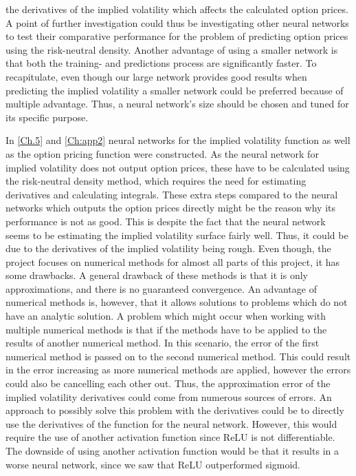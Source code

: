 the derivatives of the implied volatility which affects the calculated option prices. A point of further investigation could thus be investigating other neural networks to test their comparative performance for the problem of predicting option prices using the risk-neutral density. Another advantage of using a smaller network is that both the training- and predictions process are significantly faster. To recapitulate, even though our large network provides good results when predicting the implied volatility a smaller network could be preferred because of multiple advantage. Thus, a neural network's size should be chosen and tuned for its specific purpose.

In \autoref{Ch.5} and \autoref{Ch:app2} neural networks for the implied volatility function as well as the option pricing function were constructed. As the neural network for implied volatility does not output option prices, these have to be calculated using the risk-neutral density method, which requires the need for estimating derivatives and calculating integrals. These extra steps compared to the neural networks which outputs the option prices directly might be the reason why its performance is not as good. This is despite the fact that the neural network seems to be estimating the implied volatility surface fairly well. Thus, it could be due to the derivatives of the implied volatility being rough. Even though, the project focuses on numerical methods for almost all parts of this project, it has some drawbacks. A general drawback of these methods is that it is only approximations, and there is no guaranteed convergence. An advantage of numerical methods is, however, that it allows solutions to problems which do not have an analytic solution. A problem which might occur when working with multiple numerical methods is that if the methods have to be applied to the results of another numerical method. In this scenario, the error of the first numerical method is passed on to the second numerical method. This could result in the error increasing as more numerical methods are applied, however the errors could also be cancelling each other out. Thus, the approximation error of the implied volatility derivatives could come from numerous sources of errors. An approach to possibly solve this problem with the derivatives could be to directly use the derivatives of the function for the neural network. However, this would require the use of another activation function since ReLU is not differentiable. The downside of using another activation function would be that it results in a worse neural network, since we saw that ReLU outperformed sigmoid.


